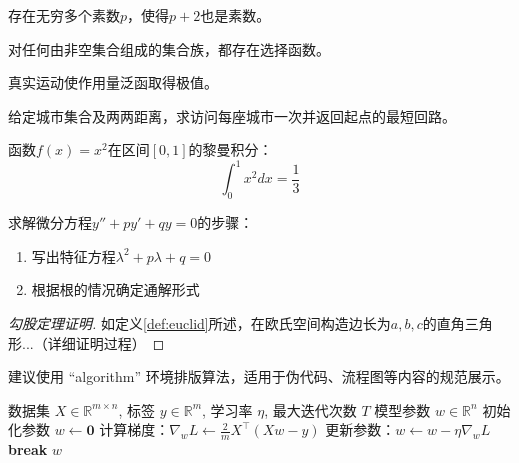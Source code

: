 \documentclass{jyuthesis}
\begin{document}
\begin{conjecture}[孪生素数猜想]\label{conj:twinprime}
存在无穷多个素数$p$，使得$p+2$也是素数。
\end{conjecture}

\begin{axiom}[选择公理]\label{axi:choice}
对任何由非空集合组成的集合族，都存在选择函数。
\end{axiom}

\begin{principle}[最小作用量原理]\label{pri:action}
真实运动使作用量泛函取得极值。
\end{principle}

\begin{problem}[旅行商问题]\label{pro:tsp}
给定城市集合及两两距离，求访问每座城市一次并返回起点的最短回路。
\end{problem}

\begin{example}[黎曼积分]\label{ex:riemann}
函数$f(x)=x^2$在区间$[0,1]$的黎曼积分：
\begin{equation}
\int_0^1 x^2 dx = \frac{1}{3}
\end{equation}
\end{example}

\begin{solution}[特征方程法]\label{sol:characteristic}
求解微分方程$y''+py'+qy=0$的步骤：
\begin{enumerate}
    \item 写出特征方程$\lambda^2+p\lambda+q=0$
    \item 根据根的情况确定通解形式
\end{enumerate}
\end{solution}

\begin{proof}[勾股定理证明]
如定义\ref{def:euclid}所述，在欧氏空间构造边长为$a,b,c$的直角三角形...（详细证明过程）
\end{proof}


建议使用 “algorithm” 环境排版算法，适用于伪代码、流程图等内容的规范展示。

\begin{algorithm}[!htbp]
\caption{梯度下降算法}\label{alg:gradient_descent}
\begin{algorithmic}[1]
\REQUIRE 数据集 $X \in \mathbb{R}^{m \times n}$, 标签 $y \in \mathbb{R}^m$, 学习率 $\eta$, 最大迭代次数 $T$
\ENSURE 模型参数 $w \in \mathbb{R}^n$
\STATE 初始化参数 $w \gets \mathbf{0}$
    \STATE 计算梯度：$\nabla_w L \gets \frac{2}{m} X^\top (Xw - y)$
    \STATE 更新参数：$w \gets w - \eta \nabla_w L$
        \STATE \textbf{break} 
    \ENDIF
\ENDFOR
\RETURN $w$
\end{algorithmic}
\end{algorithm}
\end{document}
